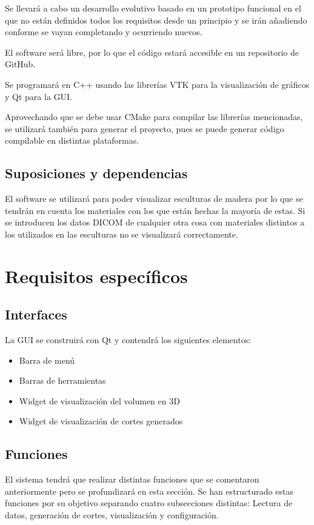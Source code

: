 	Se llevará a cabo un desarrollo evolutivo basado en un prototipo funcional en el que no están definidos todos los requisitos desde un principio y se irán añadiendo conforme se vayan completando y ocurriendo nuevos.
	
	El software será libre, por lo que el código estará accesible en un repositorio de GitHub.
	
	Se programará en C++ usando las librerías VTK para la visualización de gráficos y Qt para la GUI.
	
	Aprovechando que se debe usar CMake para compilar las librerías mencionadas, se utilizará también para generar el proyecto, pues se puede generar código compilable en distintas plataformas.
	
	\subsection{Suposiciones y dependencias}
	
	El software se utilizará para poder visualizar esculturas de madera por lo que se tendrán en cuenta los materiales con los que están hechas la mayoría de estas. Si se introducen los datos DICOM de cualquier otra cosa con materiales distintos a los utilizados en las esculturas no se visualizará correctamente.

\section{Requisitos específicos}

	\subsection{Interfaces}
	
	La GUI se construirá con Qt y contendrá los siguientes elementos:
	\begin{itemize}
		\item Barra de menú
		\item Barras de herramientas
		\item Widget de visualización del volumen en 3D
		\item Widget de visualización de cortes generados
	\end{itemize}
	
	\subsection{Funciones}
	
	El sistema tendrá que realizar distintas funciones que se comentaron anteriormente pero se profundizará en esta sección. Se han estructurado estas funciones por su objetivo separando cuatro subsecciones distintas: Lectura de datos, generación de cortes, visualización y configuración.
	
